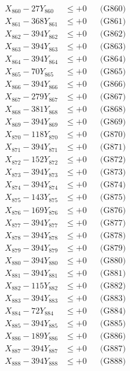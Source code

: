 \documentclass[a4paper,10pt]{article}
\begin{document}
{\begin{align}
X_{860} - 27Y_{860} &\leq +0 && \text{(G860)} \\
\allowbreak
X_{861} - 368Y_{861} &\leq +0 && \text{(G861)} \\
X_{862} - 394Y_{862} &\leq +0 && \text{(G862)} \\
X_{863} - 394Y_{863} &\leq +0 && \text{(G863)} \\
X_{864} - 394Y_{864} &\leq +0 && \text{(G864)} \\
X_{865} - 70Y_{865} &\leq +0 && \text{(G865)} \\
X_{866} - 394Y_{866} &\leq +0 && \text{(G866)} \\
X_{867} - 279Y_{867} &\leq +0 && \text{(G867)} \\
X_{868} - 381Y_{868} &\leq +0 && \text{(G868)} \\
X_{869} - 394Y_{869} &\leq +0 && \text{(G869)} \\
X_{870} - 118Y_{870} &\leq +0 && \text{(G870)} \\
\allowbreak
X_{871} - 394Y_{871} &\leq +0 && \text{(G871)} \\
X_{872} - 152Y_{872} &\leq +0 && \text{(G872)} \\
X_{873} - 394Y_{873} &\leq +0 && \text{(G873)} \\
X_{874} - 394Y_{874} &\leq +0 && \text{(G874)} \\
X_{875} - 143Y_{875} &\leq +0 && \text{(G875)} \\
X_{876} - 169Y_{876} &\leq +0 && \text{(G876)} \\
X_{877} - 394Y_{877} &\leq +0 && \text{(G877)} \\
X_{878} - 394Y_{878} &\leq +0 && \text{(G878)} \\
X_{879} - 394Y_{879} &\leq +0 && \text{(G879)} \\
X_{880} - 394Y_{880} &\leq +0 && \text{(G880)} \\
\allowbreak
X_{881} - 394Y_{881} &\leq +0 && \text{(G881)} \\
X_{882} - 115Y_{882} &\leq +0 && \text{(G882)} \\
X_{883} - 394Y_{883} &\leq +0 && \text{(G883)} \\
X_{884} - 72Y_{884} &\leq +0 && \text{(G884)} \\
X_{885} - 394Y_{885} &\leq +0 && \text{(G885)} \\
X_{886} - 189Y_{886} &\leq +0 && \text{(G886)} \\
X_{887} - 394Y_{887} &\leq +0 && \text{(G887)} \\
X_{888} - 394Y_{888} &\leq +0 && \text{(G888)} \\

\end{align}}
\end{document}
